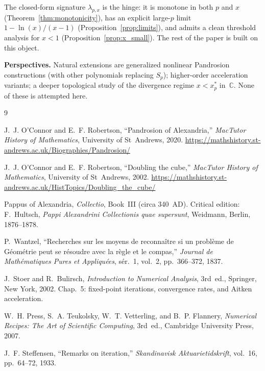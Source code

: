 \documentclass[11pt,a4paper]{article}
\theoremstyle{definition}
\begin{document}
The closed-form signature $\lambda_{p,x}$ is the hinge: it is monotone in both $p$ and $x$ (Theorem~\ref{thm:monotonicity}), has an explicit large-$p$ limit $1 - \ln(x)/(x-1)$ (Proposition~\ref{prop:limits}), and admits a clean threshold analysis for $x < 1$ (Proposition~\ref{prop:x_small}). The rest of the paper is built on this object.

\medskip

\textbf{Perspectives.} Natural extensions are generalized nonlinear Pandrosion constructions (with other polynomials replacing $S_p$); higher-order acceleration variants; a deeper topological study of the divergence regime $x < x^\ast_p$ in~$\mathbb{C}$. None of these is attempted here.

\begin{thebibliography}{9}

J.~J. O'Connor and E.~F. Robertson,
``Pandrosion of Alexandria,''
\textit{MacTutor History of Mathematics}, University of St~Andrews, 2020.
\url{https://mathshistory.st-andrews.ac.uk/Biographies/Pandrosion/}

J.~J. O'Connor and E.~F. Robertson,
``Doubling the cube,''
\textit{MacTutor History of Mathematics}, University of St~Andrews, 2002.
\url{https://mathshistory.st-andrews.ac.uk/HistTopics/Doubling_the_cube/}

Pappus of Alexandria,
\textit{Collectio}, Book~III (circa 340~AD).
Critical edition: F.~Hultsch, \textit{Pappi Alexandrini Collectionis quae supersunt},
Weidmann, Berlin, 1876--1878.

P.~Wantzel,
``Recherches sur les moyens de reconna\^itre si un probl\`eme de G\'eom\'etrie peut se r\'esoudre avec la r\`egle et le compas,''
\textit{Journal de Math\'ematiques Pures et Appliqu\'ees}, s\'er.~1, vol.~2, pp.~366--372, 1837.

J.~Stoer and R.~Bulirsch,
\textit{Introduction to Numerical Analysis},
3rd~ed., Springer, New York, 2002.
Chap.~5: fixed-point iterations, convergence rates, and Aitken acceleration.

W.~H. Press, S.~A. Teukolsky, W.~T. Vetterling, and B.~P. Flannery,
\textit{Numerical Recipes: The Art of Scientific Computing},
3rd~ed., Cambridge University Press, 2007.

J.~F. Steffensen,
``Remarks on iteration,''
\textit{Skandinavisk Aktuarietidskrift}, vol.~16, pp.~64--72, 1933.


\end{thebibliography}
\end{document}
